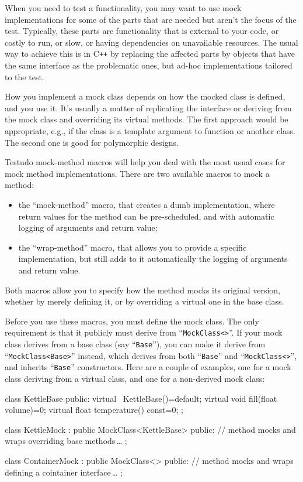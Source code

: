 \documentclass[twoside, a4paper, article]{memoir}
\newcommand*\ellipsis{\,\ldots}
\newcommand*\Cpp{C\texttt{++}}
\begin{document}
When you need to test a functionality, you may want to use mock implementations
for some of the parts that are needed but aren't the focus of the test.
Typically, these parts are functionality that is external to your code, or
costly to run, or slow, or having dependencies on unavailable resources.  The
usual way to achieve this is in \Cpp{} by replacing the affected parts by
objects that have the same interface as the problematic ones, but ad-hoc
implementations tailored to the test.

How you implement a mock class depends on how the mocked class is defined, and
you use it.  It's usually a matter of replicating the interface or deriving
from the mock class and overriding its virtual methods.  The first approach
would be appropriate, e.g., if the class is a template argument to function or
another class.  The second one is good for polymorphic designs.

Testudo mock-method macros will help you deal with the most usual cases for
mock method implementations.  There are two available macros to mock a method:
\begin{itemize}
\item the ``mock-method'' macro, that creates a dumb implementation, where
  return values for the method can be pre-scheduled, and with automatic
  logging of arguments and return value;
\item the ``wrap-method'' macro, that allows you to provide a specific
  implementation, but still adds to it automatically the logging of arguments
  and return value.
\end{itemize}
Both macros allow you to specify how the method mocks its original version,
whether by merely defining it, or by overriding a virtual one in the base
class.

Before you use these macros, you must define the mock class.  The only
requirement is that it publicly must derive from
``\texttt{MockClass<>}''.  If your mock class derives from a base
class (say ``\texttt{Base}''), you can make it derive from
``\texttt{MockClass<Base>}'' instead, which derives from both
``\texttt{Base}'' and ``\texttt{MockClass<>}'', and inherits
``\texttt{Base}'' constructors.  Here are a couple of examples, one for a mock
class deriving from a virtual class, and one for a non-derived mock class:
\begin{cpplisting}
class KettleBase {
public:
  virtual ~KettleBase()=default;
  virtual void fill(float volume)=0;
  virtual float temperature() const=0;
};

class KettleMock
  : public MockClass<KettleBase> {
public:
  // method mocks and wraps overriding base methods\ellipsis{}
};

class ContainerMock
  : public MockClass<> {
public:
  // method mocks and wraps defining a cointainer interface\ellipsis{}
};
\end{cpplisting}
\end{document}
